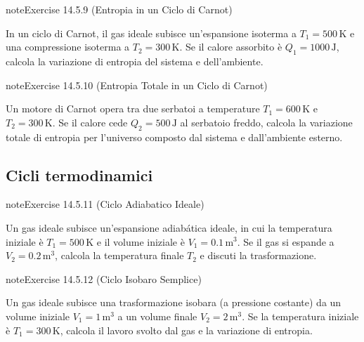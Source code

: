 \documentclass[letterpaper,10pt,italian]{jupyterBook}
\begin{document}
\begin{sphinxadmonition}{note}{Exercise 14.5.9 (Entropia in un Ciclo di Carnot)}



\sphinxAtStartPar
In un ciclo di Carnot, il gas ideale subisce un’espansione isoterma a \(T_1 = 500 \, \text{K}\) e una compressione isoterma a \(T_2 = 300 \, \text{K}\). Se il calore assorbito è \(Q_1 = 1000 \, \text{J}\), calcola la variazione di entropia del sistema e dell’ambiente.
\end{sphinxadmonition}
 \label{exercise:ch/thermodynamics/heat-engine-problems-exercise-9}

\begin{sphinxadmonition}{note}{Exercise 14.5.10 (Entropia Totale in un Ciclo di Carnot)}



\sphinxAtStartPar
Un motore di Carnot opera tra due serbatoi a temperature \(T_1 = 600 \, \text{K}\) e \(T_2 = 300 \, \text{K}\). Se il calore cede \(Q_2 = 500 \, \text{J}\) al serbatoio freddo, calcola la variazione totale di entropia per l’universo composto dal sistema e dall’ambiente esterno.
\end{sphinxadmonition}


\subsection{Cicli termodinamici}
\label{\detokenize{ch/thermodynamics/heat-engine-problems:cicli-termodinamici}} \label{exercise:ch/thermodynamics/heat-engine-problems-exercise-10}

\begin{sphinxadmonition}{note}{Exercise 14.5.11 (Ciclo Adiabatico Ideale)}



\sphinxAtStartPar
Un gas ideale subisce un’espansione adiabática ideale, in cui la temperatura iniziale è \(T_1 = 500 \, \text{K}\) e il volume iniziale è \(V_1 = 0.1 \, \text{m}^3\). Se il gas si espande a \(V_2 = 0.2 \, \text{m}^3\), calcola la temperatura finale \(T_2\) e discuti la trasformazione.
\end{sphinxadmonition}
 \label{exercise:ch/thermodynamics/heat-engine-problems-exercise-11}

\begin{sphinxadmonition}{note}{Exercise 14.5.12 (Ciclo Isobaro Semplice)}



\sphinxAtStartPar
Un gas ideale subisce una trasformazione isobara (a pressione costante) da un volume iniziale \(V_1 = 1 \, \text{m}^3\) a un volume finale \(V_2 = 2 \, \text{m}^3\). Se la temperatura iniziale è \(T_1 = 300 \, \text{K}\), calcola il lavoro svolto dal gas e la variazione di entropia.
\end{sphinxadmonition}
 \label{exercise:ch/thermodynamics/heat-engine-problems-exercise-12}
\end{document}
